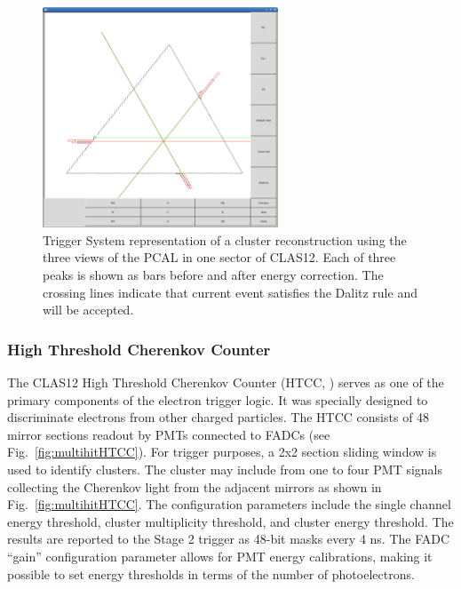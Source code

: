 \begin{figure}[htp]
	\begin{center}
		\centering
		\includegraphics[width=7cm]{img/pcal1.png}
		\caption{Trigger System representation of a cluster reconstruction using the three views of the PCAL in one sector of CLAS12. Each of three peaks is shown as bars before and after energy correction. The crossing lines indicate that current event satisfies the Dalitz rule and will be accepted.}
		\label{fig:PCAL}
	\end{center}
\end{figure} 


\subsubsection{High Threshold Cherenkov Counter}
\label{sec:HTCC}

The CLAS12 High Threshold Cherenkov Counter (HTCC, \cite{htcc-ref}) serves as one of the primary components of the electron trigger logic. It was specially designed to discriminate electrons from other charged particles. The HTCC consists of 48 mirror sections readout by PMTs connected to FADCs (see Fig.~\ref{fig:multihitHTCC}). For trigger purposes, a 2x2 section sliding window is used to identify clusters. The cluster may include from one to four PMT signals collecting the Cherenkov light from the adjacent mirrors as shown in  Fig.~\ref{fig:multihitHTCC}. The configuration parameters include the single channel energy threshold, cluster multiplicity threshold, and cluster energy threshold. The results are reported to the Stage 2 trigger as 48-bit masks every 4 ns. The FADC ``gain'' configuration parameter allows for PMT energy calibrations, making it possible to set energy thresholds in terms of the number of photoelectrons.


